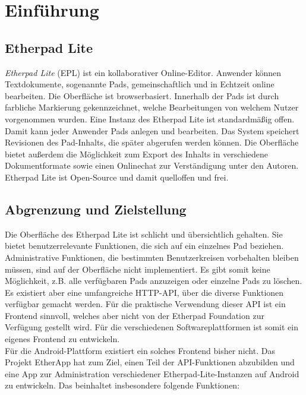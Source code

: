 \section{Einführung} %
\label{sec:intro}

\subsection{Etherpad Lite}
\label{sub:intro:etherpad}

\textit{Etherpad Lite} (EPL) ist ein kollaborativer Online-Editor.
Anwender können Textdokumente, sogenannte Pads, gemeinschaftlich und in Echtzeit online bearbeiten.
Die Oberfläche ist browserbasiert.
Innerhalb der Pads ist durch farbliche Markierung gekennzeichnet, welche Bearbeitungen von welchem Nutzer vorgenommen wurden.
Eine Instanz des Etherpad Lite ist standardmäßig offen.
Damit kann jeder Anwender Pads anlegen und bearbeiten.
Das System speichert Revisionen des Pad-Inhalts, die später abgerufen werden können.
Die Oberfläche bietet außerdem die Möglichkeit zum Export des Inhalts in verschiedene Dokumentformate sowie einen Onlinechat zur Verständigung unter den Autoren.\\
Etherpad Lite ist Open-Source und damit quelloffen und frei.

\subsection{Abgrenzung und Zielstellung}
Die Oberfläche des Etherpad Lite ist schlicht und übersichtlich gehalten.
Sie bietet benutzerrelevante Funktionen, die sich auf ein einzelnes Pad beziehen.
Administrative Funktionen, die bestimmten Benutzerkreisen vorbehalten bleiben müssen, sind auf der Oberfläche nicht implementiert.
Es gibt somit keine Möglichkeit, z.B. alle verfügbaren Pads anzuzeigen oder einzelne Pads zu löschen.\\
Es existiert aber eine umfangreiche HTTP-API, über die diverse Funktionen verfügbar gemacht werden.
Für die praktische Verwendung dieser API ist ein Frontend sinnvoll, welches aber nicht von der Etherpad Foundation zur Verfügung gestellt wird.
Für die verschiedenen Softwareplattformen ist somit ein eigenes Frontend zu entwickeln.\\
Für die Android-Plattform existiert ein solches Frontend bisher nicht.
Das Projekt EtherApp hat zum Ziel, einen Teil der API-Funktionen abzubilden und eine App zur Administration verschiedener Etherpad-Lite-Instanzen auf Android zu entwickeln.
Das beinhaltet insbesondere folgende Funktionen:

